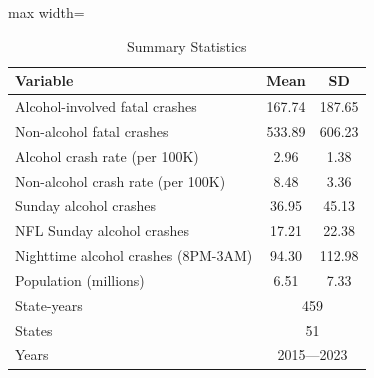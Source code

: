 \begin{table}[htbp]
\centering
\caption{Summary Statistics}
\label{tab:sumstats}
\begin{adjustbox}{max width=\textwidth}
\begin{tabular}{lcc}
\toprule
Variable & Mean & SD \\
\midrule
Alcohol-involved fatal crashes & 167.74 & 187.65 \\
Non-alcohol fatal crashes & 533.89 & 606.23 \\
Alcohol crash rate (per 100K) & 2.96 & 1.38 \\
Non-alcohol crash rate (per 100K) & 8.48 & 3.36 \\
Sunday alcohol crashes & 36.95 & 45.13 \\
NFL Sunday alcohol crashes & 17.21 & 22.38 \\
Nighttime alcohol crashes (8PM-3AM) & 94.30 & 112.98 \\
Population (millions) & 6.51 & 7.33 \\
\midrule
State-years & \multicolumn{2}{c}{459} \\
States & \multicolumn{2}{c}{51} \\
Years & \multicolumn{2}{c}{2015---2023} \\
\bottomrule
\end{tabular}
\end{adjustbox}
\end{table}
